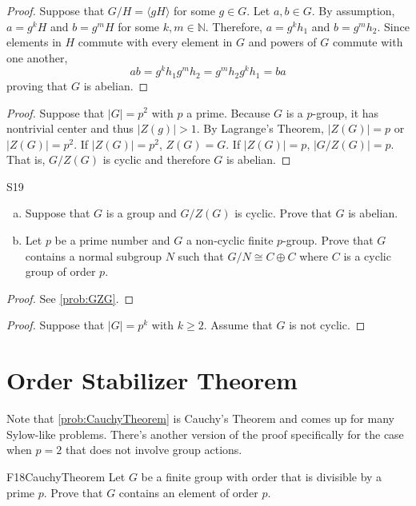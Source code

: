 \documentclass{article}
\newcommand{\N}{\mathbb{N}}
\theoremstyle{definition}
\begin{document}
	\begin{proof}
	Suppose that $G/H = \langle gH \rangle$ for some $g \in G$. Let $a, b \in G$. By assumption, $a = g^kH$ and $b = g^mH$ for some $k,m \in \N$. Therefore, $a = g^kh_1$ and $b= g^m h_2$. Since elements in $H$ commute with every element in $G$ and powers of $G$ commute with one another,
		\[ab = g^kh_1g^mh_2 = g^mh_2g^k h_1 = ba \]
	proving that $G$ is abelian.
	\end{proof}
	
	\begin{proof}
	Suppose that $|G| = p^2$ with $p$ a prime. Because $G$ is a $p$-group, it has nontrivial center and thus $|Z(g)| > 1$. By Lagrange's Theorem, $|Z(G)| = p$ or $|Z(G)| = p^2$. If $|Z(G)| =p^2$, $Z(G) = G$. If $|Z(G)| = p$, $\left|G/Z(G) \right| = p$. That is, $G/Z(G)$ is cyclic and therefore $G$ is abelian.
	\end{proof}
	
	\begin{prob}{S19}{}
	\begin{enumerate}[(a)]
	\item Suppose that $G$ is a group and $G/Z(G)$ is cyclic. Prove  that $G$ is abelian.
	\item Let $p$ be a prime number and $G$ a non-cyclic finite $p$-group. Prove that $G$ contains a normal subgroup $N$ such that $G/N \cong C \oplus C$ where $C$ is a cyclic group of order $p$.
	\end{enumerate}
	\end{prob}
	
	\begin{proof}
	See \ref{prob:GZG}.
	\end{proof}
	
	\begin{proof}
	Suppose that $|G| = p^k$ with $k \geq 2$. Assume that $G$ is not cyclic.
	\end{proof}
	

\section{Order Stabilizer Theorem}

Note that \ref{prob:CauchyTheorem} is Cauchy's Theorem and comes up for many Sylow-like problems. There's another version of the proof specifically for the case when $p = 2$ that does not involve group actions.

	\begin{prob}{F18}{CauchyTheorem}
	Let $G$ be a finite group with order that is divisible by a prime $p$. Prove that $G$ contains an element of order $p$.
	\end{prob}
	
\end{document}
